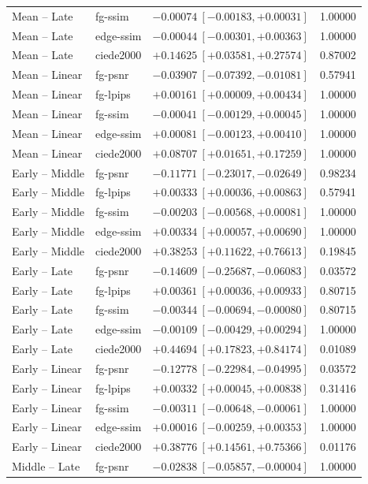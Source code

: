 \documentclass[11pt]{article}
\begin{document}
\begin{longtable}{llrr}
Mean -- Late & fg-ssim & $-0.00074\ [-0.00183,+0.00031]$ & 1.00000 \\
Mean -- Late & edge-ssim & $-0.00044\ [-0.00301,+0.00363]$ & 1.00000 \\
Mean -- Late & ciede2000 & $+0.14625\ [+0.03581,+0.27574]$ & 0.87002 \\
Mean -- Linear & fg-psnr & $-0.03907\ [-0.07392,-0.01081]$ & 0.57941 \\
Mean -- Linear & fg-lpips & $+0.00161\ [+0.00009,+0.00434]$ & 1.00000 \\
Mean -- Linear & fg-ssim & $-0.00041\ [-0.00129,+0.00045]$ & 1.00000 \\
Mean -- Linear & edge-ssim & $+0.00081\ [-0.00123,+0.00410]$ & 1.00000 \\
Mean -- Linear & ciede2000 & $+0.08707\ [+0.01651,+0.17259]$ & 1.00000 \\
Early -- Middle & fg-psnr & $-0.11771\ [-0.23017,-0.02649]$ & 0.98234 \\
Early -- Middle & fg-lpips & $+0.00333\ [+0.00036,+0.00863]$ & 0.57941 \\
Early -- Middle & fg-ssim & $-0.00203\ [-0.00568,+0.00081]$ & 1.00000 \\
Early -- Middle & edge-ssim & $+0.00334\ [+0.00057,+0.00690]$ & 1.00000 \\
Early -- Middle & ciede2000 & $+0.38253\ [+0.11622,+0.76613]$ & 0.19845 \\
Early -- Late & fg-psnr & $-0.14609\ [-0.25687,-0.06083]$ & 0.03572 \\
Early -- Late & fg-lpips & $+0.00361\ [+0.00036,+0.00933]$ & 0.80715 \\
Early -- Late & fg-ssim & $-0.00344\ [-0.00694,-0.00080]$ & 0.80715 \\
Early -- Late & edge-ssim & $-0.00109\ [-0.00429,+0.00294]$ & 1.00000 \\
Early -- Late & ciede2000 & $+0.44694\ [+0.17823,+0.84174]$ & 0.01089 \\
Early -- Linear & fg-psnr & $-0.12778\ [-0.22984,-0.04995]$ & 0.03572 \\
Early -- Linear & fg-lpips & $+0.00332\ [+0.00045,+0.00838]$ & 0.31416 \\
Early -- Linear & fg-ssim & $-0.00311\ [-0.00648,-0.00061]$ & 1.00000 \\
Early -- Linear & edge-ssim & $+0.00016\ [-0.00259,+0.00353]$ & 1.00000 \\
Early -- Linear & ciede2000 & $+0.38776\ [+0.14561,+0.75366]$ & 0.01176 \\
Middle -- Late & fg-psnr & $-0.02838\ [-0.05857,-0.00004]$ & 1.00000 \\

\end{longtable}
\end{document}

